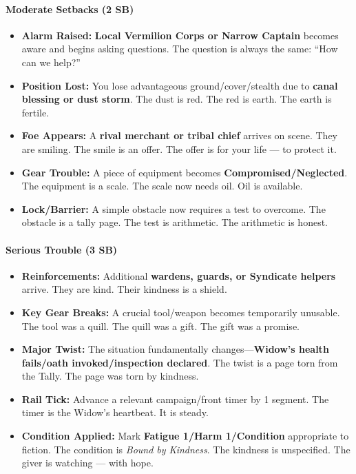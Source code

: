 \paragraph{Moderate Setbacks (2 SB)}
\begin{itemize}
\item \textbf{Alarm Raised:} \textbf{Local Vermilion Corps or Narrow Captain} becomes aware and begins asking questions. The question is always the same: ``How can we help?''
\item \textbf{Position Lost:} You lose advantageous ground/cover/stealth due to \textbf{canal blessing or dust storm}. The dust is red. The red is earth. The earth is fertile.
\item \textbf{Foe Appears:} A \textbf{rival merchant or tribal chief} arrives on scene. They are smiling. The smile is an offer. The offer is for your life --- to protect it.
\item \textbf{Gear Trouble:} A piece of equipment becomes \textbf{Compromised/Neglected}. The equipment is a scale. The scale now needs oil. Oil is available.
\item \textbf{Lock/Barrier:} A simple obstacle now requires a test to overcome. The obstacle is a tally page. The test is arithmetic. The arithmetic is honest.
\end{itemize}

\paragraph{Serious Trouble (3 SB)}
\begin{itemize}
\item \textbf{Reinforcements:} Additional \textbf{wardens, guards, or Syndicate helpers} arrive. They are kind. Their kindness is a shield.
\item \textbf{Key Gear Breaks:} A crucial tool/weapon becomes temporarily unusable. The tool was a quill. The quill was a gift. The gift was a promise.
\item \textbf{Major Twist:} The situation fundamentally changes---\textbf{Widow's health fails/oath invoked/inspection declared}. The twist is a page torn from the Tally. The page was torn by kindness.
\item \textbf{Rail Tick:} Advance a relevant campaign/front timer by 1 segment. The timer is the Widow's heartbeat. It is steady.
\item \textbf{Condition Applied:} Mark \textbf{Fatigue 1/Harm 1/Condition} appropriate to fiction. The condition is \textit{Bound by Kindness}. The kindness is unspecified. The giver is watching --- with hope.
\end{itemize}

